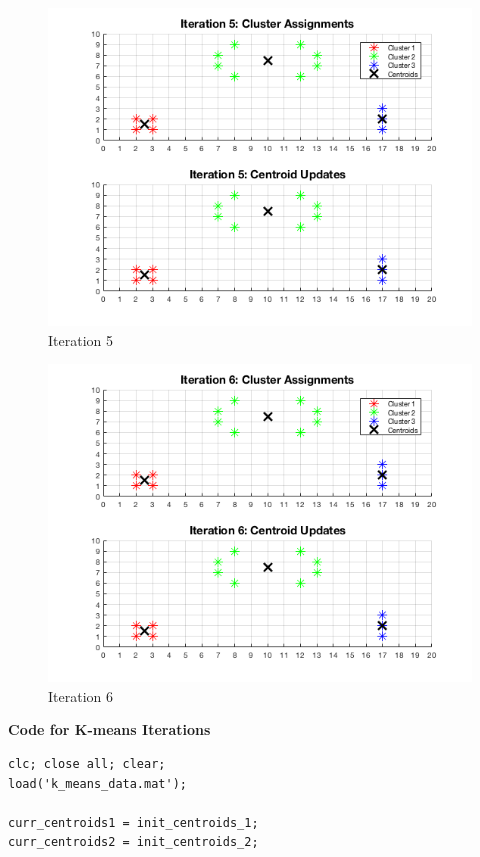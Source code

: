 \documentclass[english]{article}
\begin{document}
\begin{enumerate}
    \begin{figure}[H]
    \centering
    \includegraphics[scale = 0.85]{iter5_b}
    \caption{Iteration 5}
    \end{figure}
    
    \begin{figure}[H]
    \centering
    \includegraphics[scale = 0.85]{iter6_b}
    \caption{Iteration 6}
    \end{figure}
    
    \noindent\textbf{Code for K-means Iterations}
    \color{black}
    \begin{verbatim}
clc; close all; clear;
load('k_means_data.mat');

curr_centroids1 = init_centroids_1;
curr_centroids2 = init_centroids_2;


\end{verbatim}
\end{enumerate}
\end{document}
